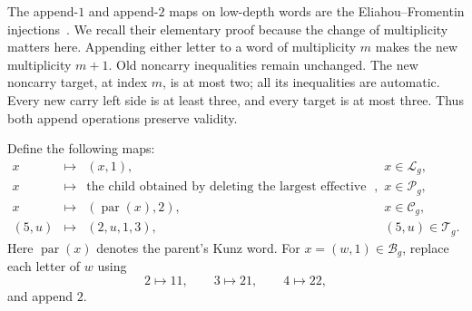 \documentclass[11pt]{amsart}
\theoremstyle{definition}
\theoremstyle{remark}
\numberwithin{equation}{section}
\begin{document}
The append-$1$ and append-$2$ maps on low-depth words are the
Eliahou--Fromentin injections~\cite[Propositions~5.2--5.3]{EF}. We recall their elementary proof
because the change of multiplicity matters here. Appending either letter
to a word of multiplicity $m$ makes the new multiplicity $m+1$. Old
noncarry inequalities remain unchanged. The new noncarry target, at index
$m$, is at most two; all its inequalities are automatic. Every new carry
left side is at least three, and every target is at most three. Thus both
append operations preserve validity.

Define the following maps:
\begin{equation}\label{cmb:maps}
\begin{array}{rcll}
 x&\longmapsto&(x,1),&x\in\mathcal L_g,\\
 x&\longmapsto&\text{the child obtained by deleting the largest effective generator},
      &x\in\mathcal P_g,\\
 x&\longmapsto&(\operatorname{par}(x),2),&x\in\mathcal C_g,\\
 (5,u)&\longmapsto&(2,u,1,3),&(5,u)\in\mathcal T_g.
\end{array}
\end{equation}
Here $\operatorname{par}(x)$ denotes the parent's Kunz word. For
$x=(w,1)\in\mathcal B_g$, replace each letter of $w$ using
\begin{equation}\label{cmb:code}
 2\longmapsto11,\qquad3\longmapsto21,\qquad4\longmapsto22,
\end{equation}
and append $2$.
\end{document}
